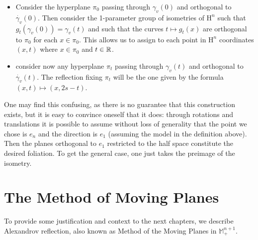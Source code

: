 \begin{itemize}
\begin{itemize}
		\item Consider the hyperplane $\pi_0$ passing through $\gamma_v(0)$ and orthogonal to  $\dot{\gamma_v}(0)$. Then consider the 1-parameter group of isometries of $\mathrm{H}^n$ such that $g_t(\gamma_v (0) )=\gamma_v (t) $ and such that the curves $t \mapsto g_t(x)$ are orthogonal to $\pi_0$ for each $x\in \pi_0$. This allows us to assign to each point in $\mathrm{H}^n$ coordinates $(x, t)$ where $x\in\pi_0$ and $t\in \mathbb{R}$.  
		\item consider now any hyperplane  $\pi_t$ passing through $\gamma_v(t)$ and orthogonal to  $\dot{\gamma_v}(t)$. The reflection fixing $\pi_t$ will be the one given by the formula $(x, t)\mapsto (x, 2s-t)$.
	\end{itemize}
	One may find this confusing, as there is no guarantee that this construction exists, but it is easy to convince oneself that it does: through rotations and translations it is possible to assume without loss of generality that the point we chose is $e_n$ and the direction is $e_1$ (assuming the model in the definition above). Then the planes orthogonal to $e_1$ restricted to the half space constitute the desired foliation. To get the general case, one just takes the preimage of the isometry. 
\end{itemize}


\section{The Method of Moving Planes}
\label{method moving planes}

To provide some justification and context to the next chapters, we describe Alexandrov reflection, also known as Method of the Moving Planes in $\mathbb{M}^{n+1}_+$.  


